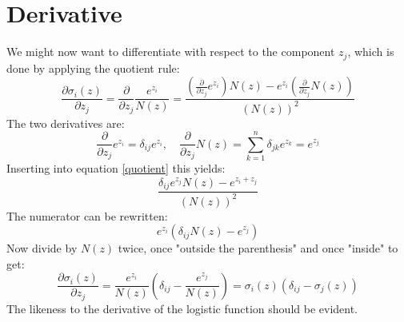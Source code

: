 \documentclass[12pt, a4paper]{article}
\numberwithin{equation}{section}
\begin{document}
\section{Derivative}
We might now want to differentiate with respect to the component $z_j$, which is done by applying the quotient rule:
\begin{equation}
\label{quotient}
\frac{\partial\sigma_i(z)}{\partial z_j}=\frac{\partial}{\partial z_j}\frac{e^{z_i}}{N(z)}=\frac{\left(\frac{\partial}{\partial z_j}e^{z_i}\right)N(z)-e^{z_i}\left(\frac{\partial}{\partial z_j}N(z)\right)}{(N(z))^2}
\end{equation}
The two derivatives are:
\begin{equation}
\frac{\partial}{\partial z_j}e^{z_i}=\delta_{ij}e^{z_i},\quad\frac{\partial}{\partial z_j}N(z)=\sum_{k=1}^n\delta_{jk}e^{z_k}=e^{z_j}
\end{equation}
Inserting into equation \ref{quotient} this yields:
\begin{equation}
\frac{\delta_{ij}e^{z_j}N(z)-e^{z_i+z_j}}{(N(z))^2}
\end{equation}
The numerator can be rewritten:
\begin{equation}
e^{z_i}\left(\delta_{ij}N(z)-e^{z_j}\right)
\end{equation}
Now divide by $N(z)$ twice, once "outside the parenthesis" and once "inside" to get:
\begin{equation}
\label{derivative}
\frac{\partial\sigma_i(z)}{\partial z_j}=\frac{e^{z_i}}{N(z)}\left(\delta_{ij}-\frac{e^{z_j}}{N(z)}\right)=\sigma_i(z)\left(\delta_{ij}-\sigma_j(z)\right)
\end{equation}
The likeness to the derivative of the logistic function should be evident.
\end{document}
